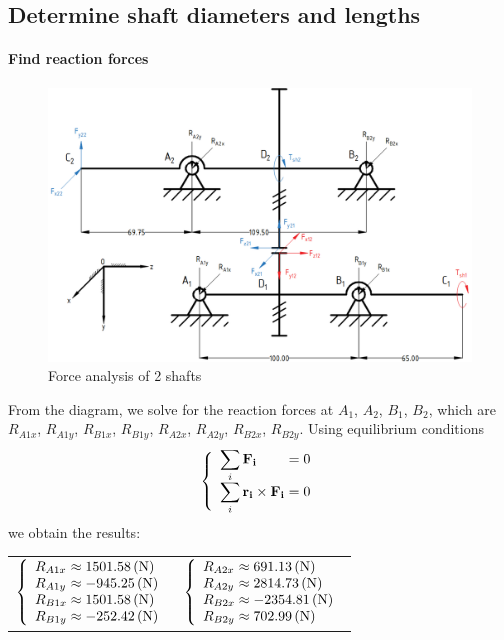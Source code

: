 \subsection{Determine shaft diameters and lengths}

\paragraph{Find reaction forces}

\begin{figure}[ht]
	\centering
	\includegraphics[width=160mm]{shaft.png}
	\caption{Force analysis of 2 shafts}
	\label{force on shaft}
\end{figure}

From the diagram, we solve for the reaction forces at $ A_1 $, $ A_2 $, $ B_1 $, $ B_2 $, which are $ R_{A1x} $, $ R_{A1y} $, $ R_{B1x} $, $ R_{B1y} $, $ R_{A2x} $, $ R_{A2y} $, $ R_{B2x} $, $ R_{B2y} $. Using equilibrium conditions
\[
\left\{ 
\begin{array}{l@{{}={}}l}
\displaystyle\sum_{i} \mathbf{F_{i}} & 0\\
\displaystyle\sum_{i} \mathbf{r_i}\times \mathbf{F_i}& 0\\
\end{array}
\right.
\]
we obtain the results:\vskip2mm
	{\centering
	\begin{tabular}[ht]{p{7cm}p{7cm}}
		$
		\left\{ 
		\begin{array}{l@{{} \approx {}}l}
		R_{A1x} & 1501.58\unit{(N)}\\
		R_{A1y} & -945.25\unit{(N)}\\
		R_{B1x} & 1501.58\unit{(N)}\\
		R_{B1y} & -252.42\unit{(N)}\\
		\end{array}
		\right.
		$ & $
		\left\{ 
		\begin{array}{l@{{} \approx {}}l}
		R_{A2x} & 691.13\unit{(N)}\\
		R_{A2y} & 2814.73\unit{(N)}\\
		R_{B2x} & -2354.81\unit{(N)}\\
		R_{B2y} & 702.99\unit{(N)}\\
		\end{array}
		\right.
		$
	\end{tabular}}

